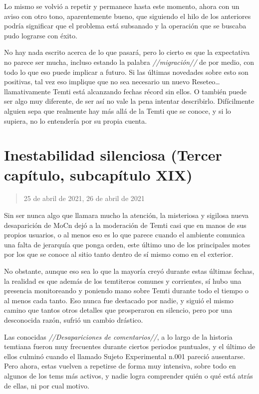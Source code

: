 \documentclass[
  spanish,
]{book}
\begin{document}
Lo mismo se volvió a repetir y permanece hasta este momento, ahora con un aviso con otro tono, aparentemente bueno, que siguiendo el hilo de los anteriores podría significar que el problema está subsanado y la operación que se buscaba pudo lograrse con éxito.

No hay nada escrito acerca de lo que pasará, pero lo cierto es que la expectativa no parece ser mucha, incluso estando la palabra \emph{//migración//} de por medio, con todo lo que eso puede implicar a futuro.
Si las últimas novedades sobre esto son positivas, tal vez eso implique que no sea necesario un nuevo Reseteo\ldots{} llamativamente Temti está alcanzando fechas récord sin ellos. O también puede ser algo muy diferente, de ser así no vale la pena intentar describirlo. Difícilmente alguien sepa que realmente hay más allá de la Temti que se conoce, y si lo supiera, no lo entendería por su propia cuenta.

\hypertarget{inestabilidad-silenciosa-tercer-capuxedtulo-subcapuxedtulo-xix}{%
\section{Inestabilidad silenciosa (Tercer capítulo, subcapítulo XIX)}\label{inestabilidad-silenciosa-tercer-capuxedtulo-subcapuxedtulo-xix}}

\begin{quote}
25 de abril de 2021, 26 de abril de 2021
\end{quote}

Sin ser nunca algo que llamara mucho la atención, la misteriosa y sigilosa nueva desaparición de MoCn dejó a la moderación de Temti casi que en manos de sus propios usuarios, o al menos eso es lo que parece cuando el ambiente comunica una falta de jerarquía que ponga orden, este último uno de los principales motes por los que se conoce al sitio tanto dentro de sí mismo como en el exterior.

No obstante, aunque eso sea lo que la mayoría creyó durante estas últimas fechas, la realidad es que además de los temtiteros comunes y corrientes, sí hubo una presencia monitoreando y poniendo mano sobre Temti durante todo el tiempo o al menos cada tanto.
Eso nunca fue destacado por nadie, y siguió el mismo camino que tantos otros detalles que prosperaron en silencio, pero por una desconocida razón, sufrió un cambio drástico.

Las conocidas \emph{//Desapariciones de comentarios//}, a lo largo de la historia temtiana fueron muy frecuentes durante ciertos periodos puntuales, y el último de ellos culminó cuando el llamado Sujeto Experimental n.001 pareció ausentarse. Pero ahora, estas vuelven a repetirse de forma muy intensiva, sobre todo en algunos de los tems más activos, y nadie logra comprender quién o qué está atrás de ellas, ni por cual motivo.
\end{document}
